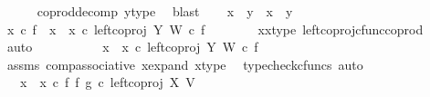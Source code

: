 \begin{isabellebody}
\ \ \ \ \isamarkupfalse%
\ coprod{\isacharunderscore}{\kern0pt}decomp\ y{\isacharunderscore}{\kern0pt}type\ \isamarkupfalse%
\ blast\isanewline
\isanewline
\ \ \isamarkupfalse%
\ {\isachardoublequoteopen}{\isacharparenleft}{\kern0pt}x{}\ {\isacharequal}{\kern0pt}\ y{}{\isacharparenright}{\kern0pt}\ {\isasymand}\ {\isacharparenleft}{\kern0pt}x{}\ {\isacharequal}{\kern0pt}\ y{}{\isacharparenright}{\kern0pt}{\isachardoublequoteclose}\isanewline
\ \ \isamarkupfalse%
\isanewline
\ \ \ \ \isamarkupfalse%
\ {\isachardoublequoteopen}x{}\ {\isasymcirc}\isactrlsub c\ f\ {\isacharequal}{\kern0pt}\ {\isacharparenleft}{\kern0pt}{\isacharparenleft}{\kern0pt}x{}\ {\isasymamalg}\ x{}{\isacharparenright}{\kern0pt}\ {\isasymcirc}\isactrlsub c\ left{\isacharunderscore}{\kern0pt}coproj\ Y\ W{\isacharparenright}{\kern0pt}\ {\isasymcirc}\isactrlsub c\ f{\isachardoublequoteclose}\isanewline
\ \ \ \ \ \ \isamarkupfalse%
\ x{}{\isacharunderscore}{\kern0pt}x{}{\isacharunderscore}{\kern0pt}type\ left{\isacharunderscore}{\kern0pt}coproj{\isacharunderscore}{\kern0pt}cfunc{\isacharunderscore}{\kern0pt}coprod\ \isamarkupfalse%
\ auto\ \isanewline
\ \ \ \ \isamarkupfalse%
\ \isamarkupfalse%
\ {\isachardoublequoteopen}{\isachardot}{\kern0pt}{\isachardot}{\kern0pt}{\isachardot}{\kern0pt}\ {\isacharequal}{\kern0pt}\ {\isacharparenleft}{\kern0pt}x{}\ {\isasymamalg}\ x{}{\isacharparenright}{\kern0pt}\ {\isasymcirc}\isactrlsub c\ left{\isacharunderscore}{\kern0pt}coproj\ Y\ W\ {\isasymcirc}\isactrlsub c\ f{\isachardoublequoteclose}\isanewline
\ \ \ \ \ \ \isamarkupfalse%
\ assms\ comp{\isacharunderscore}{\kern0pt}associative{}\ x{\isacharunderscore}{\kern0pt}expand\ x{\isacharunderscore}{\kern0pt}type\ \isamarkupfalse%
\ {\isacharparenleft}{\kern0pt}typecheck{\isacharunderscore}{\kern0pt}cfuncs{\isacharcomma}{\kern0pt}\ auto{\isacharparenright}{\kern0pt}\isanewline
\ \ \ \ \isamarkupfalse%
\ \isamarkupfalse%
\ {\isachardoublequoteopen}{\isachardot}{\kern0pt}{\isachardot}{\kern0pt}{\isachardot}{\kern0pt}\ {\isacharequal}{\kern0pt}\ {\isacharparenleft}{\kern0pt}x{}\ {\isasymamalg}\ x{}{\isacharparenright}{\kern0pt}\ {\isasymcirc}\isactrlsub c\ {\isacharparenleft}{\kern0pt}f\ {\isasymbowtie}\isactrlsub f\ g{\isacharparenright}{\kern0pt}\ {\isasymcirc}\isactrlsub c\ left{\isacharunderscore}{\kern0pt}coproj\ X\ V{\isachardoublequoteclose}\isanewline

\end{isabellebody}
